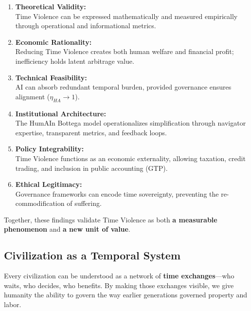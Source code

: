 \begin{enumerate}
    \item \textbf{Theoretical Validity:}\\
    Time Violence can be expressed mathematically and measured empirically through operational and informational metrics.
    
    \item \textbf{Economic Rationality:}\\
    Reducing Time Violence creates both human welfare and financial profit; inefficiency holds latent arbitrage value.
    
    \item \textbf{Technical Feasibility:}\\
    AI can absorb redundant temporal burden, provided governance ensures alignment ($\eta_{HA} \to 1$).
    
    \item \textbf{Institutional Architecture:}\\
    The HumAIn Bottega model operationalizes simplification through navigator expertise, transparent metrics, and feedback loops.
    
    \item \textbf{Policy Integrability:}\\
    Time Violence functions as an economic externality, allowing taxation, credit trading, and inclusion in public accounting (GTP).
    
    \item \textbf{Ethical Legitimacy:}\\
    Governance frameworks can encode time sovereignty, preventing the re-commodification of suffering.
\end{enumerate}

Together, these findings validate Time Violence as both \textbf{a measurable phenomenon} and \textbf{a new unit of value}.

\subsection{Civilization as a Temporal System}
\label{sec:temporal-civilization}

Every civilization can be understood as a network of \textbf{time exchanges}—who waits, who decides, who benefits. By making those exchanges visible, we give humanity the ability to govern  the way earlier generations governed property and labor.

